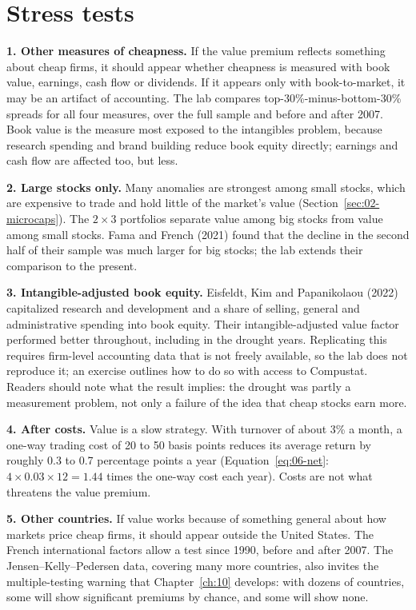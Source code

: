 \section{Stress tests}
\label{sec:08-stress}

\textbf{1. Other measures of cheapness.} If the value premium reflects something about cheap firms, it should appear whether cheapness is measured with book value, earnings, cash flow or dividends. If it appears only with book-to-market, it may be an artifact of accounting. The lab compares top-30\%-minus-bottom-30\% spreads for all four measures, over the full sample and before and after 2007. Book value is the measure most exposed to the intangibles problem, because research spending and brand building reduce book equity directly; earnings and cash flow are affected too, but less.

\textbf{2. Large stocks only.} Many anomalies are strongest among small stocks, which are expensive to trade and hold little of the market's value (Section~\ref{sec:02-microcaps}). The $2 \times 3$ portfolios separate value among big stocks from value among small stocks. Fama and French (2021) found that the decline in the second half of their sample was much larger for big stocks; the lab extends their comparison to the present.

\textbf{3. Intangible-adjusted book equity.} Eisfeldt, Kim and Papanikolaou (2022) capitalized research and development and a share of selling, general and administrative spending into book equity. Their intangible-adjusted value factor performed better throughout, including in the drought years. Replicating this requires firm-level accounting data that is not freely available, so the lab does not reproduce it; an exercise outlines how to do so with access to Compustat. Readers should note what the result implies: the drought was partly a measurement problem, not only a failure of the idea that cheap stocks earn more.

\textbf{4. After costs.} Value is a slow strategy. With turnover of about 3\% a month, a one-way trading cost of 20 to 50 basis points reduces its average return by roughly 0.3 to 0.7 percentage points a year (Equation~\eqref{eq:06-net}: $4 \times 0.03 \times 12 = 1.44$ times the one-way cost each year). Costs are not what threatens the value premium.

\textbf{5. Other countries.} If value works because of something general about how markets price cheap firms, it should appear outside the United States. The French international factors allow a test since 1990, before and after 2007. The Jensen--Kelly--Pedersen data, covering many more countries, also invites the multiple-testing warning that Chapter~\ref{ch:10} develops: with dozens of countries, some will show significant premiums by chance, and some will show none.

